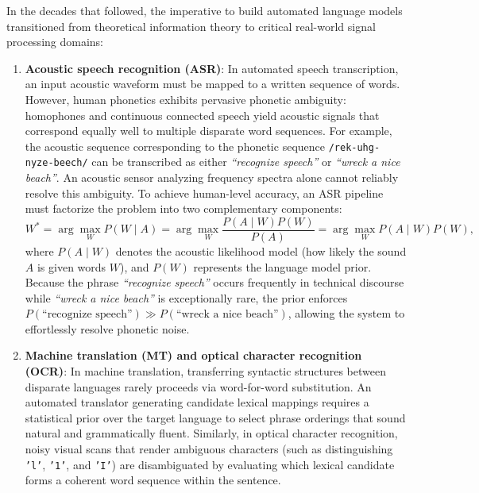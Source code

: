 \documentclass[../../../main.tex]{subfiles}
\begin{document}
In the decades that followed, the imperative to build automated language models transitioned from theoretical information theory to critical real-world signal processing domains:
\begin{enumerate}
    \item \textbf{Acoustic speech recognition (ASR)}: In automated speech transcription, an input acoustic waveform must be mapped to a written sequence of words. However, human phonetics exhibits pervasive phonetic ambiguity: homophones and continuous connected speech yield acoustic signals that correspond equally well to multiple disparate word sequences. For example, the acoustic sequence corresponding to the phonetic sequence \texttt{/rek-uhg-nyze-beech/} can be transcribed as either \textit{``recognize speech''} or \textit{``wreck a nice beach''}. An acoustic sensor analyzing frequency spectra alone cannot reliably resolve this ambiguity. To achieve human-level accuracy, an ASR pipeline must factorize the problem into two complementary components:
    \begin{equation}
    W^* = \arg\max_W P(W \mid A) = \arg\max_W \frac{P(A \mid W) P(W)}{P(A)} = \arg\max_W P(A \mid W) P(W),
    \label{eq:noisy_channel_asr}
    \end{equation}
    where $P(A \mid W)$ denotes the acoustic likelihood model (how likely the sound $A$ is given words $W$), and $P(W)$ represents the language model prior. Because the phrase \textit{``recognize speech''} occurs frequently in technical discourse while \textit{``wreck a nice beach''} is exceptionally rare, the prior enforces $P(\text{``recognize speech''}) \gg P(\text{``wreck a nice beach''})$, allowing the system to effortlessly resolve phonetic noise.
    
    \item \textbf{Machine translation (MT) and optical character recognition (OCR)}: In machine translation, transferring syntactic structures between disparate languages rarely proceeds via word-for-word substitution. An automated translator generating candidate lexical mappings requires a statistical prior over the target language to select phrase orderings that sound natural and grammatically fluent. Similarly, in optical character recognition, noisy visual scans that render ambiguous characters (such as distinguishing \texttt{'l'}, \texttt{'1'}, and \texttt{'I'}) are disambiguated by evaluating which lexical candidate forms a coherent word sequence within the sentence.
\end{enumerate}
\end{document}
